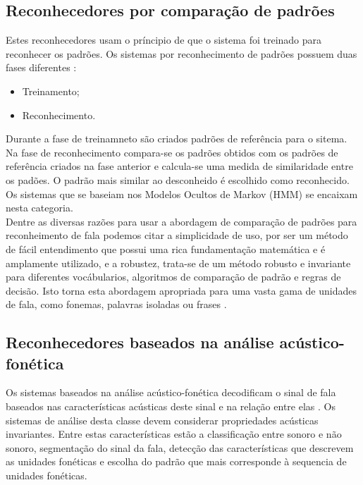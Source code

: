 \subsection{Reconhecedores por comparação de padrões}

Estes reconhecedores usam o príncipio de que o sistema foi treinado para reconhecer os padrões. Os sistemas por reconhecimento de padrões possuem duas fases diferentes :
\begin{itemize}
\item Treinamento;
\item Reconhecimento.
\end{itemize}

Durante a fase de treinamneto são criados padrões de referência para o sitema. Na fase de reconhecimento compara-se os padrões obtidos com os padrões de referência criados na fase anterior e calcula-se uma medida de similaridade entre os padões. O padrão mais similar ao desconheido é escolhido como reconhecido. Os sistemas que se baseiam nos Modelos Ocultos de Markov (HMM) se encaixam nesta categoria.\\

Dentre as diversas razões para usar a abordagem de comparação de padrões para reconheimento de fala podemos citar a simplicidade de uso, por ser um método de fácil entendimento que possui uma rica fundamentação matemática e é amplamente utilizado,  e a robustez, trata-se de um método robusto e invariante para diferentes vocábularios, algoritmos de comparação de padrão e regras de decisão. Isto torna esta abordagem apropriada para uma vasta gama de unidades de fala, como fonemas, palavras isoladas ou frases  \cite{fundRecFala}. 

\subsection{Reconhecedores baseados na análise acústico-fonética}

Os sistemas baseados na análise acústico-fonética decodificam o sinal de fala  baseados nas características acústicas deste sinal e na relação entre elas \cite{kluwer}. Os sistemas de análise desta classe devem considerar propriedades acústicas invariantes. Entre estas características estão a classificação entre sonoro e não sonoro, segmentação do sinal da fala, detecção das características que descrevem as unidades fonéticas e escolha do padrão que mais corresponde à sequencia de unidades fonéticas.\\

